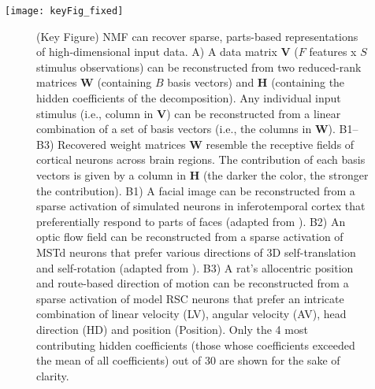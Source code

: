 \begin{figure*}[h]
	\centering
	\texttt{[image: keyFig\_fixed]}
	\label{fig:NMF|reconstruction}
\end{figure*}

\begin{figure}[t!]
	\centering
    \caption{(Key Figure) \ac{NMF} can recover sparse, parts-based
         representations of high-dimensional input data.
         A)  A data matrix \textbf{V} ($F$ features x $S$ stimulus
             observations) can be reconstructed from two reduced-rank
             matrices \textbf{W} (containing $B$ basis vectors) and 
             \textbf{H} (containing the hidden coefficients of the
             decomposition).
             Any individual input stimulus (i.e., column in \textbf{V})
             can be reconstructed from a linear combination of a set of
             basis vectors (i.e., the columns in \textbf{W}).
         B1--B3) Recovered weight matrices \textbf{W} resemble the
             receptive fields of cortical neurons across brain regions. The contribution of each basis vectors is given by a column 
             in \textbf{H} (the darker the color, the stronger the
             contribution).
         B1) A facial image can be reconstructed from a sparse activation
             of simulated neurons in inferotemporal cortex that
             preferentially respond to parts of faces
             (adapted from \cite{LeeSeung1999}).
         B2) An optic flow field can be reconstructed from a sparse
             activation of \ac{MSTd} neurons that prefer various
             directions of 3D self-translation and self-rotation
             (adapted from \cite{Beyeler2016}).
         B3) A rat's allocentric position and route-based direction of
             motion can be reconstructed from a sparse activation of
             model \ac{RSC} neurons that prefer an intricate combination of
             linear velocity (LV), angular velocity (AV), head direction (HD)
             and position (Position). Only the 4 most contributing hidden coefficients (those whose coefficients exceeded the mean of all coefficients) out of 30 are shown for the
             sake of clarity.}
	\label{fig:NMF|reconstruction}
\end{figure}


